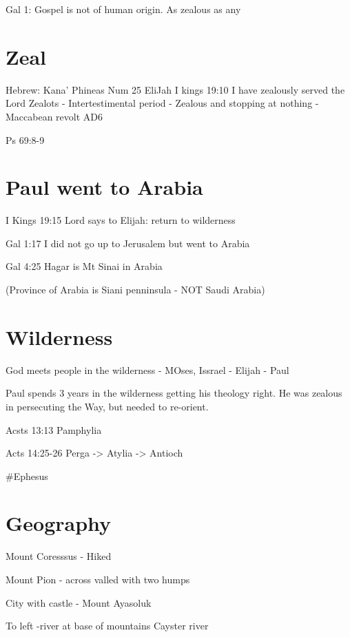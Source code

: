 \documentclass[
]{book}
\begin{document}
Gal 1: Gospel is not of human origin. As zealous as any

\hypertarget{zeal}{%
\section{Zeal}\label{zeal}}

Hebrew: Kana'
Phineas
Num 25
EliJah
I kings 19:10 I have zealously served the Lord
Zealots - Intertestimental period
- Zealous and stopping at nothing
- Maccabean revolt AD6

Ps 69:8-9

\hypertarget{paul-went-to-arabia}{%
\section{Paul went to Arabia}\label{paul-went-to-arabia}}

I Kings 19:15 Lord says to Elijah: return to wilderness

Gal 1:17 I did not go up to Jerusalem but went to Arabia

Gal 4:25 Hagar is Mt Sinai in Arabia

(Province of Arabia is Siani penninsula - NOT Saudi Arabia)

\hypertarget{wilderness}{%
\section{Wilderness}\label{wilderness}}

God meets people in the wilderness - MOses, Issrael - Elijah - Paul

Paul spends 3 years in the wilderness getting his theology right. He was zealous in persecuting the Way, but needed to re-orient.

Acsts 13:13 Pamphylia

Acts 14:25-26 Perga -\textgreater{} Atylia -\textgreater{} Antioch

\#Ephesus

\hypertarget{geography-1}{%
\section{Geography}\label{geography-1}}

Mount Coresssus - Hiked

Mount Pion - across valled with two humps

City with castle - Mount Ayasoluk

To left -river at base of mountains Cayster river
\end{document}
